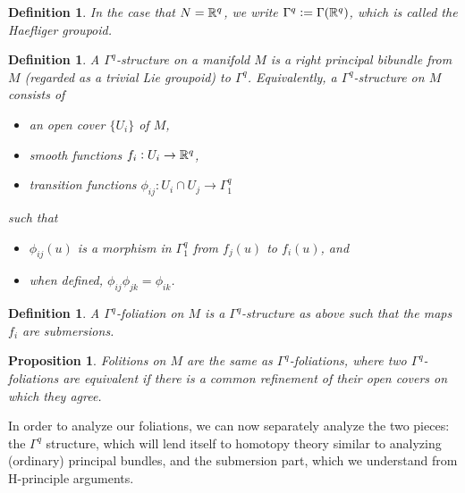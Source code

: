 \documentclass{article}
\newtheorem{proposition}[theorem]{Proposition}
\newtheorem{definition}[theorem]{Definition}
\newtheorem{proposed work}[theorem]{Proposed Work}
\theoremstyle{definition}
\begin{document}
\begin{definition}
  In the case that $N=\mathbb R^q$, we write $\Gamma^q:=\Gamma(\mathbb R^q)$, which is called the \emph{Haefliger groupoid}.
\end{definition}
\begin{definition}
  A $\Gamma^q$\emph{-structure} on a manifold $M$ is a right principal bibundle from $M$ (regarded as a trivial Lie groupoid) to $\Gamma^q$. Equivalently, a $\Gamma^q$-structure on $M$ consists of
  \begin{itemize}
  \item an open cover $\{U_i\}$ of $M$,
  \item smooth functions $f_i:U_i\to \mathbb R^q$,
  \item transition functions $\phi_{ij}: U_i\cap U_j\to \Gamma^q_1$
  \end{itemize}
  such that
  \begin{itemize}
  \item $\phi_{ij}(u)$ is a morphism in $\Gamma^q_1$ from $f_j(u)$ to $f_i(u)$, and
  \item when defined, $\phi_{ij}\phi_{jk}=\phi_{ik}$.
    \end{itemize}
  \end{definition}
  \begin{definition}
    A $\Gamma^q$\emph{-foliation} on $M$ is a $\Gamma^q$-structure as above such that the maps $f_i$ are submersions.
  \end{definition}
  \begin{proposition}
    Folitions on $M$ are the same as $\Gamma^q$-foliations, where two $\Gamma^q$-foliations are equivalent if there is a common refinement of their open covers on which they agree.
  \end{proposition}
  In order to analyze our foliations, we can now separately analyze the two pieces: the $\Gamma^q$ structure, which will lend itself to homotopy theory similar to analyzing (ordinary) principal bundles, and the submersion part, which we understand from H-principle arguments.
\end{document}
